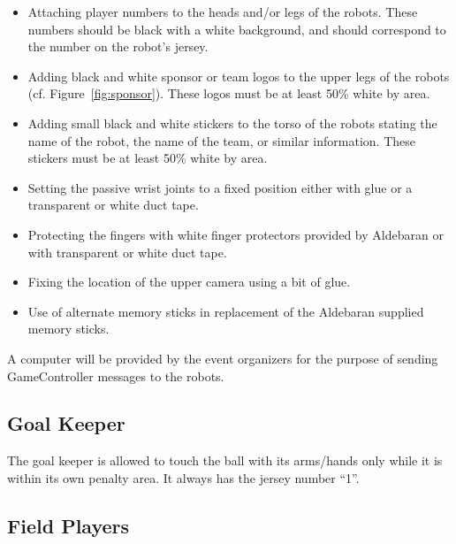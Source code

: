 \documentclass[12pt]{article}
\newcommand{\cf}{\mbox{cf.}\xspace}
\begin{document}
\begin{itemize}

\item Attaching player numbers to the heads and/or legs of the robots.  These numbers should be black with a white background, and should correspond to the number on the robot's jersey.

\item Adding black and white sponsor or team logos to the upper legs of the robots (\cf Figure~\ref{fig:sponsor}). These logos must be at least 50\% white by area.

\item Adding small black and white stickers to the torso of the robots stating the name of the robot, the name of the team, or similar information. These stickers must be at least 50\% white by area.

\item Setting the passive wrist joints to a fixed position either with glue or a transparent or white duct tape.

\item Protecting the fingers with white finger protectors provided by Aldebaran or with transparent or white duct tape.

\item Fixing the location of the upper camera using a bit of glue. 

\item Use of alternate memory sticks in replacement of the Aldebaran supplied memory sticks.

\end{itemize}

A computer will be provided by the event organizers for the purpose of sending GameController messages to the robots.

\subsection{Goal Keeper}
\label{sec:goal_keeper}

The goal keeper is allowed to touch the ball with its arms/hands only while it is within its own penalty area. It always has the jersey number ``1''.

\subsection{Field Players}
\label{sec:field_players}
\end{document}

